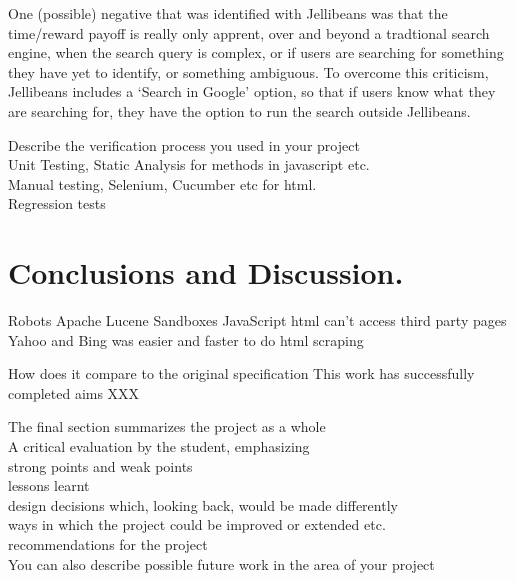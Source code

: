 \documentclass[a4paper, 11pt]{article}
\begin{document}
One (possible) negative that was identified with Jellibeans was that the time/reward payoff is really only apprent, over and beyond a tradtional search engine, when the search query is complex, or if users are searching for something they have yet to identify, or something ambiguous. To overcome this criticism, Jellibeans includes a `Search in Google' option, so that if users know what they are searching for, they have the option to run the search outside Jellibeans.


Describe the verification process you used in your project\\
Unit Testing, Static Analysis for methods in javascript etc.\\
Manual testing, Selenium, Cucumber etc for html.\\
Regression tests


\section{Conclusions and Discussion.}

Robots
Apache Lucene
Sandboxes
JavaScript html can't access third party pages
Yahoo and Bing was easier and faster to do html scraping


How does it compare to the original specification
This work has successfully completed aims XXX

The final section summarizes the project as a whole\\
A critical evaluation by the student, emphasizing\\
strong points and weak points\\
lessons learnt\\
design decisions which, looking back, would be made differently\\
ways in which the project could be improved or extended etc.\\
recommendations for the project\\
You can also describe possible future work in the area of your project
\end{document}

